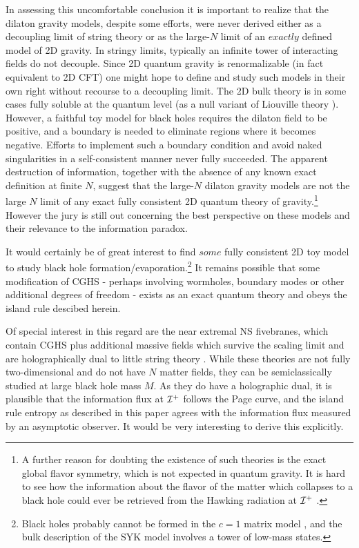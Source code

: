 \documentclass[12pt,oneside,letterpaper]{article}
\def\m{{M}}
\numberwithin{equation}{section}
\begin{document}
In assessing this uncomfortable conclusion it is important to realize that the dilaton gravity models, despite some efforts, were never  
derived either as a decoupling limit of string theory or as the large-$N$ limit of an $exactly$ defined model of 2D gravity.  In stringy limits, typically an infinite tower of interacting fields do not decouple.  Since 2D quantum gravity is renormalizable (in fact equivalent to 2D CFT) one might hope to define and study such models in their own right without recourse to a decoupling limit.  The  2D bulk theory is in some cases fully soluble at the quantum level (as a null variant of Liouville theory  \cite{deAlwis:1992hv,Bilal:1992kv}). However, a faithful toy model for black holes requires the dilaton field to be positive, and a boundary is needed to eliminate regions where it becomes negative.  Efforts to implement such a boundary condition and avoid naked singularities  in a self-consistent manner never fully succeeded. 
The apparent destruction of information, together with the absence of any known exact definition at finite $N$, suggest that the large-$N$ dilaton gravity models are not the large $N$ limit of any exact fully consistent 2D quantum  theory of gravity.\footnote{A further reason for doubting the existence of such theories is the exact global flavor symmetry, which is not expected in quantum gravity. It is hard to see how the information about the flavor of the matter which collapses to a black hole  could ever be retrieved from the Hawking radiation at ${\cal I}^+$ .} However the jury is still out concerning the best perspective on these models and their relevance to the information paradox. 


It would certainly be of great interest to find $some$ fully consistent 2D toy model to study black hole formation/evaporation.\footnote{Black holes probably cannot be formed  in the $c=1$ matrix model \cite{Karczmarek:2004bw}, and the bulk description  of the  SYK model \cite{Sachdev:1992fk,kitaevfirsttalk} involves a tower of low-mass states. } It remains possible that some modification of CGHS - perhaps involving wormholes, boundary modes or other additional degrees of freedom - exists as an exact quantum theory and obeys the island rule descibed herein. 

Of special interest in this regard are the near extremal NS fivebranes, which contain CGHS plus additional massive fields which survive the scaling limit and are  holographically dual to little string theory \cite{Callan:1992rs,Maldacena:1997cg,Aharony:1998ub}. While these theories are not  fully two-dimensional and do not have $N$ matter fields, they can be semiclassically studied at large black hole mass $\m$. As they do have a holographic dual, it is plausible that the information flux at ${\cal I}^+$  follows the Page curve, and the island rule  entropy as described in this paper agrees with the information flux measured by an asymptotic observer.  It would be very interesting to derive this explicitly. 
\end{document}
